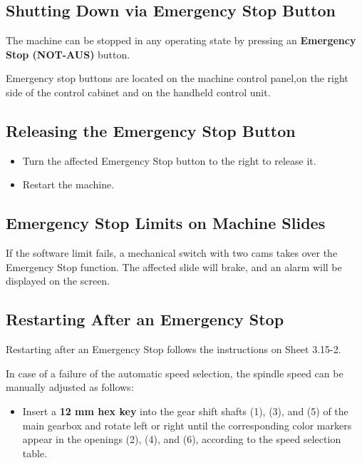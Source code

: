 \subsection{Shutting Down via Emergency Stop Button}
The machine can be stopped in any operating state by pressing an \textbf{Emergency Stop (NOT-AUS)} button.

Emergency stop buttons are located on the machine control panel,on the right side of the control cabinet and on the handheld control unit.

\subsection{Releasing the Emergency Stop Button}


\begin{itemize}
    \item Turn the affected Emergency Stop button to the right to release it.
    \item Restart the machine.
\end{itemize}

\subsection{Emergency Stop Limits on Machine Slides}
If the software limit fails, a mechanical switch with two cams takes over the Emergency Stop function.  
The affected slide will brake, and an alarm will be displayed on the screen.

\subsection{Restarting After an Emergency Stop}
Restarting after an Emergency Stop follows the instructions on Sheet 3.15-2.


\setcounter{section}{3}
\setcounter{page}{2}

In case of a failure of the automatic speed selection, the spindle speed can be manually adjusted as follows:

\begin{itemize}
    \item Insert a \textbf{12 mm hex key} into the gear shift shafts (1), (3), and (5) of the main gearbox and rotate left or right until the corresponding color markers appear in the openings (2), (4), and (6), according to the speed selection table.
\end{itemize}

